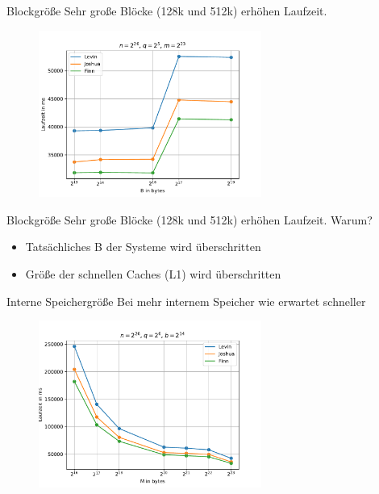 \documentclass[ngerman,aspectratio=169,10pt]{beamer}
\begin{document}
\begin{frame}{Blockgröße}
Sehr große Blöcke (128k und 512k) erhöhen Laufzeit.
\begin{figure}[H]
    \centering
    \includegraphics[width=0.65\textwidth]{Figure_1.pdf}
    \label{fig:Figure1}
\end{figure}
\end{frame}

\begin{frame}{Blockgröße}
Sehr große Blöcke (128k und 512k) erhöhen Laufzeit. Warum?
\begin{itemize}
    \item Tatsächliches B der Systeme wird überschritten
    \item Größe der schnellen Caches (L1) wird überschritten
\end{itemize}
\end{frame}

\begin{frame}{Interne Speichergröße}
Bei mehr internem Speicher wie erwartet schneller
\begin{figure}[H]
    \centering
    \includegraphics[width=0.65\textwidth]{m__n_67108864_q_64_b_16384.pdf}
    \label{fig:f1}
\end{figure}
\end{frame}
\end{document}
